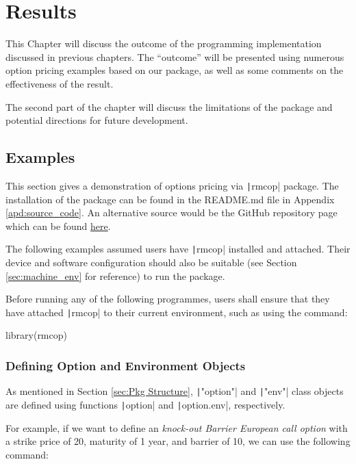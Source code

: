 \chapter{Results} \label{cpt:Results}

This Chapter will discuss the outcome of the programming implementation discussed in previous chapters. The ``outcome'' will be presented using numerous option pricing examples based on our package, as well as some comments on the effectiveness of the result.

The second part of the chapter will discuss the limitations of the package and potential directions for future development.

\section{Examples} \label{sec:examples}

This section gives a demonstration of options pricing via \texttt|rmcop| package. The installation of the package can be found in the README.md file in Appendix \ref{apd:source_code}. An alternative source would be the GitHub repository page which can be found \hyperref{https://github.com/ZhaiJason/rmcop}{site}{rmcop GitHub repository}{here}.

The following examples assumed users have \texttt|rmcop| installed and attached. Their device and software configuration should also be suitable (see Section \ref{sec:machine_env} for reference) to run the package.

Before running any of the following programmes, users shall ensure that they have attached \texttt|rmcop| to their current environment, such as using the command:

\begin{Rminted}
library(rmcop)
\end{Rminted}

\subsection{Defining Option and Environment Objects}

As mentioned in Section \ref{sec:Pkg Structure}, \texttt|"option"| and \texttt|"env"| class objects are defined using functions \texttt|option| and \texttt|option.env|, respectively.

For example, if we want to define an \textit{knock-out Barrier European call option} with a strike price of 20, maturity of 1 year, and barrier of 10, we can use the following command:

